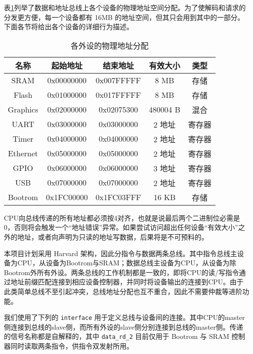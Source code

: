表\ref{table:address_allocation}列举了数据和地址总线上各个设备的物理地址空间分配。为了使解码和请求的分发更方便，每一个设备都有 16MB 的地址空间，但其只会用到其中的一部分。下面各节将给出各个设备的详细行为描述。

\begin{table}[!htbp]
    \centering
    \begin{tabular}{|c|c|c|c|c|}
    \hline
    \textbf{名称} & \textbf{起始地址} & \textbf{结束地址} & \textbf{有效大小} & \textbf{类型} \\ \hline
    SRAM        & 0x00000000    & 0x007FFFFF    & 8 MB          & 存储          \\ \hline
    Flash       & 0x01000000    & 0x017FFFFF    & 8 MB          & 存储          \\ \hline
    Graphics    & 0x02000000    & 0x02075300    & 480004 B      & 混合          \\ \hline
    UART        & 0x03000000    & 0x03000000    & 2 地址          & 寄存器         \\ \hline
    Timer       & 0x04000000    & 0x04000000    & 2 地址          & 寄存器         \\ \hline
    Ethernet    & 0x05000000    & 0x05000000    & 2 地址          & 寄存器         \\ \hline
    GPIO        & 0x06000000    & 0x06000000    & 3 地址          & 寄存器         \\ \hline
    USB         & 0x07000000    & 0x07000000    & 2 地址          & 寄存器         \\ \hline
    Bootrom     & 0x1FC00000    & 0x1FC03FFF    & 16 KB         & 存储          \\ \hline
    \end{tabular}
    \caption{各外设的物理地址分配}
    \label{table:address_allocation}
\end{table}

CPU向总线传递的所有地址都必须按4对齐，也就是说最后两个二进制位必需是0，否则将会触发一个“地址错误”异常。如果尝试访问超出任何设备“有效大小”之外的地址，或者向声明为只读的地址写数据，后果将是不可预料的。

本项目计划采用 Harvard 架构，因此分指令与数据两条总线。其中指令总线主设备为CPU，从设备为Bootrom与SRAM；数据总线主设备为CPU，从设备为除Bootrom外所有外设。两条总线的工作机制都是一致的，即将CPU的读/写指令通过地址前缀匹配连接到相应设备控制器，并同时将设备输出的连接到CPU。由于此类简单总线不至引起冲突，总线地址分配也互不重合，因此不需要仲裁等进阶功能。

我们使用了下列的 \texttt{interface} 用于定义总线与设备间的连接。其中CPU的master侧连接到总线的slave侧，而所有外设的slave侧分别连接到总线的master侧。传递的信号名称都是自解释的，其中 \texttt{data\_rd\_2} 目前仅用于 Bootrom 与 SRAM 控制器同时读取两条指令，供指令双发射所用。

